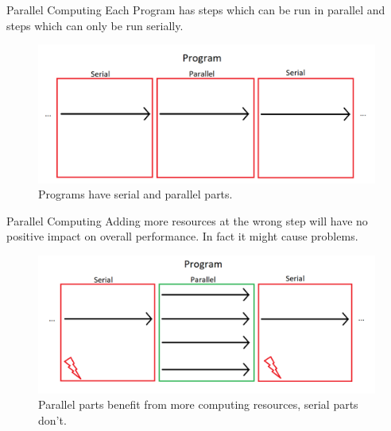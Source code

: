 \documentclass{beamer}
\begin{document}
\begin{frame}{Parallel Computing}
	Each Program has steps which can be run in parallel and steps which can only be run serially.
	\begin{figure}
		\centering
	\includegraphics[width=\textwidth]{parallul.png}
	\caption{Programs have serial and parallel parts.}
	\end{figure}
\end{frame}
\begin{frame}{Parallel Computing}
Adding more resources at the wrong step will have no positive impact on overall performance. In fact it might cause problems.
	\begin{figure}
		\centering
		\includegraphics[width=\textwidth]{paraomegalul.png}
		\caption{Parallel parts benefit from more computing resources, serial parts don't.}
	\end{figure}
\end{frame}
\end{document}
